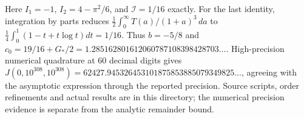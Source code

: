 Here $I_1=-1$, $I_2=4-\pi^2/6$, and $\mathcal I=1/16$ exactly. For the
last identity, integration by parts reduces
$\tfrac12\int_0^\infty T(a)/(1+a)^3\,da$ to
$\tfrac14\int_0^1(1-t+t\log t)dt=1/16$.
Thus $b=-5/8$ and
$c_0=19/16+G_*/2=1.285162801612060787108398428703\ldots$.
High-precision numerical quadrature at 60 decimal digits gives
$J(0,10^{308},10^{308})=62427.945326453101875853885079349825\ldots$,
agreeing with the asymptotic expression through the reported precision.
Source scripts, order refinements and actual results are in this directory;
the numerical precision evidence is separate from the analytic remainder bound.
